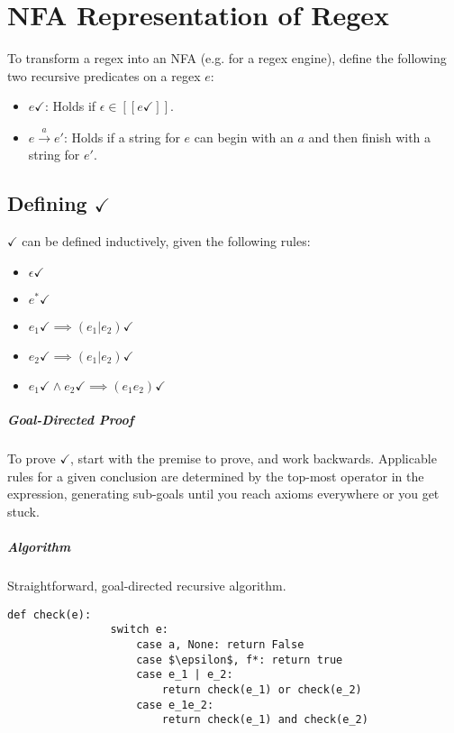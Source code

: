 \documentclass[11pt]{article}
\begin{document}
\section{NFA Representation of Regex}
	To transform a regex into an NFA (e.g. for a regex engine), define the following two recursive predicates on a regex $e$:
	\begin{itemize}
		\item $e\checkmark$: Holds if $\epsilon \in [[e\checkmark]]$.
		\item $e \xrightarrow{a} e'$: Holds if a string for $e$ can begin with an $a$ and then finish with a string for $e'$.
	\end{itemize}
	
	\subsection{Defining $\checkmark$}
		$\checkmark$ can be defined inductively, given the following rules:
		\begin{itemize}
			\item $\epsilon\checkmark$
			\item $e^*\checkmark$
			\item $e_1\checkmark \implies (e_1 | e_2)\checkmark$
			\item $e_2\checkmark \implies (e_1 | e_2)\checkmark$
			\item $e_1\checkmark \wedge e_2\checkmark \implies (e_1e_2)\checkmark$
		\end{itemize}
		
		\subparagraph{Goal-Directed Proof} To prove $\checkmark$, start with the premise to prove, and work backwards. Applicable rules for a given conclusion are determined by the top-most operator in the expression, generating sub-goals until you reach axioms everywhere or you get stuck.
		
		\subparagraph{Algorithm} Straightforward, goal-directed recursive algorithm.
		\begin{lstlisting}[autogobble=true,mathescape]
			def check(e):
				switch e:
					case a, None: return False
					case $\epsilon$, f*: return true
					case e_1 | e_2:
						return check(e_1) or check(e_2)
					case e_1e_2:
						return check(e_1) and check(e_2)
		\end{lstlisting}
		
\end{document}

